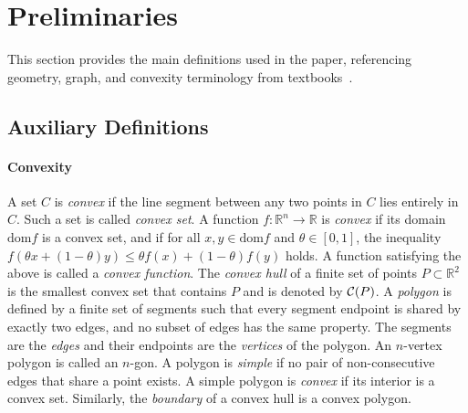 \section{Preliminaries}\label{sec:preliminaries}
    This section provides the main definitions used in the paper, referencing geometry, graph, and convexity terminology from textbooks~\cite{Preparata1985,cormen2009,Diestel2017,boyd2004}.
\ifConf
\begin{toappendix}
\section{Auxiliary Definitions}
\else
\begin{toappendix}
\fi
\ifFull
\paragraph*{Convexity}
\fi
    A set $C$ is \emph{convex} if the line segment between any two points in $C$ lies entirely in $C$. Such a set is called \emph{convex set}. 
    A function $f:\mathbb{R}^n \rightarrow \mathbb{R}$ is \emph{convex} if its domain $\mathrm{dom} f$ is a convex set, and if for all $x,y \in \mathrm{dom} f$ and $\theta \in [0,1]$, the inequality
    $f(\theta x + (1-\theta)y) \leq \theta f(x) + (1-\theta)f(y)$ holds. 
    A function satisfying the above is called a \emph{convex function}. 
    The \emph{convex hull} of a finite set of points $P \subset \mathbb{R}^2$ is the smallest convex set that contains $P$ and is denoted by $\mathcal{C}(P)$.
    A \emph{polygon} is defined by a finite set of segments such that every segment endpoint is shared by exactly two edges, and no subset of edges has the same property. 
    The segments are the \emph{edges} and their endpoints are the \emph{vertices} of the polygon. 
    An $n$-vertex polygon is called an $n$-gon.
    A polygon is \emph{simple} if no pair of non-consecutive edges that share a point exists.
    A simple polygon is \emph{convex} if its interior is a convex set.
    Similarly, the \emph{boundary} of a convex hull is a convex polygon.

\end{toappendix}


\end{toappendix}
